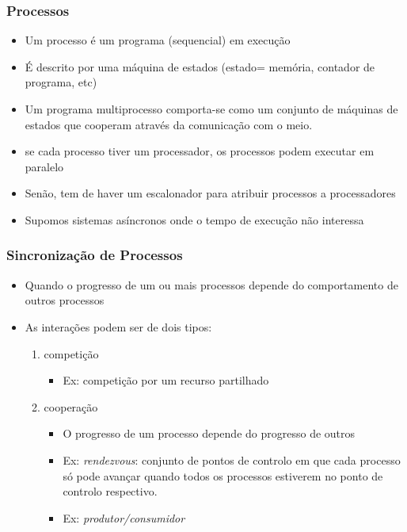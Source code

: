 \documentclass[aspectratio=169]{beamer}
\begin{document}
\begin{frame}
  

\frametitle{Processos}

\begin{itemize}[<+->]
  \item Um \alert{processo} é  um programa (sequencial) em execução
\item É descrito por uma máquina de estados (estado= memória, contador de programa, etc)
\item Um \alert{programa multiprocesso} comporta-se como um conjunto de máquinas de estados que cooperam através  da comunicação com o meio.
\item se cada processo tiver um processador, os processos podem executar em paralelo
\item Senão, tem de haver um \alert{escalonador}  para atribuir processos a processadores
 \item Supomos sistemas asíncronos onde \alert{o tempo de execução não interessa}

\end{itemize}
\end{frame}

\begin{frame}
\frametitle{Sincronização de Processos} 
\begin{itemize}[<+->]
  \item Quando o progresso de um ou mais  processos depende do comportamento de outros processos
\item As interações podem ser de dois tipos:
\begin{enumerate}
\item competição 
\begin{itemize}
\item Ex: competição por um recurso partilhado
\end{itemize}
 \item cooperação

\begin{itemize}
\item O progresso de um processo depende do progresso de outros
\item Ex: \emph{rendezvous}: conjunto de pontos de controlo em que cada processo só pode avançar quando todos os processos estiverem no ponto de controlo respectivo.
\item Ex: \emph{produtor/consumidor}
\end{itemize}
 
\end{enumerate}
\end{itemize}

\end{frame}
\end{document}
